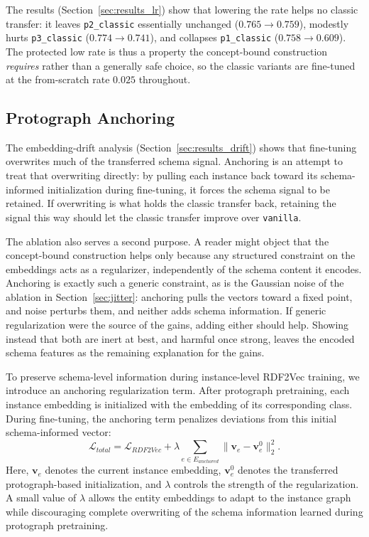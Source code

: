 \documentclass[a4paper,oneside,bibliography=totoc]{scrbook}
\begin{document}
The results (Section~\ref{sec:results_lr}) show that lowering the rate helps no
classic transfer: it leaves \texttt{p2\_classic} essentially unchanged
($0.765 \rightarrow 0.759$), modestly hurts \texttt{p3\_classic}
($0.774 \rightarrow 0.741$), and collapses \texttt{p1\_classic}
($0.758 \rightarrow 0.609$). The protected low rate is thus a property the
concept-bound construction \emph{requires} rather than a generally safe choice,
so the classic variants are fine-tuned at the from-scratch rate $0.025$
throughout.

\subsection{Protograph Anchoring}
\label{sec:anchoring}

The embedding-drift analysis (Section~\ref{sec:results_drift}) shows that
fine-tuning overwrites much of the transferred schema signal. Anchoring is an
attempt to treat that overwriting directly: by pulling each instance back toward
its schema-informed initialization during fine-tuning, it forces the schema
signal to be retained. If overwriting is what holds the classic transfer back,
retaining the signal this way should let the classic transfer improve over
\texttt{vanilla}.

The ablation also serves a second purpose. A reader might object that the
concept-bound construction helps only because any structured constraint on the
embeddings acts as a regularizer, independently of the schema content it encodes.
Anchoring is exactly such a generic constraint, as is the Gaussian noise of the
ablation in Section~\ref{sec:jitter}: anchoring pulls the vectors toward a fixed
point, and noise perturbs them, and neither adds schema information. If generic
regularization were the source of the gains, adding either should help. Showing
instead that both are inert at best, and harmful once strong, leaves the encoded
schema features as the remaining explanation for the gains.

To preserve schema-level information during instance-level RDF2Vec training, we
introduce an anchoring regularization term. After protograph pretraining, each
instance embedding is initialized with the embedding of its corresponding class.
During fine-tuning, the anchoring term penalizes deviations from this initial
schema-informed vector:
\[
\mathcal{L}_{total}
=
\mathcal{L}_{RDF2Vec}
+
\lambda
\sum_{e \in E_{anchored}}
\lVert \mathbf{v}_e - \mathbf{v}^{0}_e \rVert_2^2 .
\]
Here, \(\mathbf{v}_e\) denotes the current instance embedding, \(\mathbf{v}^{0}_e\) denotes the transferred protograph-based initialization, and \(\lambda\) controls the strength of the regularization.
A small value of \(\lambda\) allows the entity embeddings to adapt to the instance graph while discouraging complete overwriting of the schema information learned during protograph pretraining.
\end{document}
